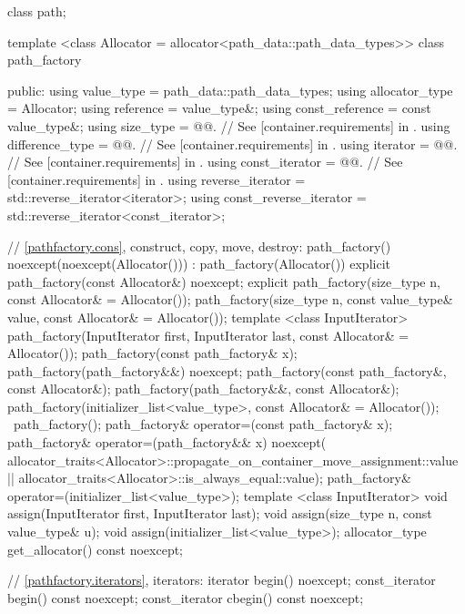 \begin{codeblock}
{{{{  class path;

  template <class Allocator = allocator<path_data::path_data_types>>
  class path_factory {
  public:
    using value_type = path_data::path_data_types;
    using allocator_type = Allocator;
    using reference = value_type&;
    using const_reference = const value_type&;
    using size_type       = @@. // See [container.requirements] in \cppseventeen.
    using difference_type = @@. // See [container.requirements] in \cppseventeen.
    using iterator       = @@. // See [container.requirements] in \cppseventeen.
    using const_iterator = @@. // See [container.requirements] in \cppseventeen.
    using reverse_iterator       = std::reverse_iterator<iterator>;
    using const_reverse_iterator = std::reverse_iterator<const_iterator>;
    
    // \ref{pathfactory.cons}, construct, copy, move, destroy:
    path_factory() noexcept(noexcept(Allocator())) :
      path_factory(Allocator()) { }
    explicit path_factory(const Allocator&) noexcept;
    explicit path_factory(size_type n, const Allocator& = Allocator());
    path_factory(size_type n, const value_type& value,
      const Allocator& = Allocator());
    template <class InputIterator>
    path_factory(InputIterator first, InputIterator last,
      const Allocator& = Allocator());
    path_factory(const path_factory& x);
    path_factory(path_factory&&) noexcept;
    path_factory(const path_factory&, const Allocator&);
    path_factory(path_factory&&, const Allocator&);
    path_factory(initializer_list<value_type>, const Allocator& = Allocator());
    ~path_factory();
    path_factory& operator=(const path_factory& x);
    path_factory& operator=(path_factory&& x)
      noexcept(
      allocator_traits<Allocator>::propagate_on_container_move_assignment::value
      ||
      allocator_traits<Allocator>::is_always_equal::value);
    path_factory& operator=(initializer_list<value_type>);
    template <class InputIterator>
    void assign(InputIterator first, InputIterator last);
    void assign(size_type n, const value_type& u);
    void assign(initializer_list<value_type>);
    allocator_type get_allocator() const noexcept;
    
    // \ref{pathfactory.iterators}, iterators:
    iterator begin() noexcept;
    const_iterator begin() const noexcept;
    const_iterator cbegin() const noexcept;

}}}}}
\end{codeblock}
